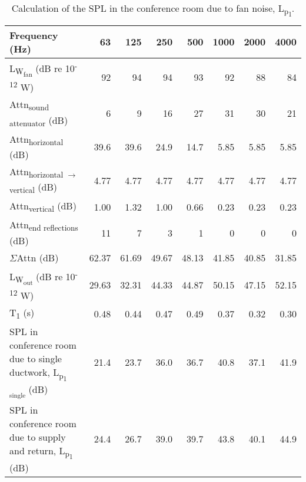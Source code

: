 \begin{table}[htbp]
	\caption{Calculation of the SPL in the conference room due to fan noise, L\textsubscript{p\textsubscript{1}}.}
	\label{tbl:BN_conf}
	\centering
	\begin{tabular}{@{}m{8cm}rrrrrrr@{}}
		\toprule
		Frequency (Hz) & 63 & 125 & 250 & 500 & 1000 & 2000 & 4000 \\ \midrule
		L\textsubscript{W\textsubscript{fan}} (dB re 10\textsuperscript{-12} W) & 92 & 94 & 94 & 93 & 92 & 88 & 84 \\
		Attn\textsubscript{sound attenuator} (dB) & 6 & 9 & 16 & 27 & 31 & 30 & 21 \\
		Attn\textsubscript{horizontal} (dB) & 39.6 & 39.6 & 24.9 & 14.7 & 5.85 & 5.85 & 5.85 \\
		Attn\textsubscript{horizontal $\rightarrow$ vertical} (dB) & 4.77 & 4.77 & 4.77 & 4.77 & 4.77 & 4.77 & 4.77 \\
		Attn\textsubscript{vertical} (dB) & 1.00 & 1.32 & 1.00 & 0.66 & 0.23 & 0.23 & 0.23 \\
		Attn\textsubscript{end reflections} (dB) & 11 & 7 & 3 & 1 & 0 & 0 & 0 \\
		$\Sigma$Attn (dB) & 62.37 & 61.69 & 49.67 & 48.13 & 41.85 & 40.85 & 31.85 \\
		L\textsubscript{W\textsubscript{out}} (dB re 10\textsuperscript{-12} W) & 29.63 & 32.31 & 44.33 & 44.87 & 50.15 & 47.15 & 52.15 \\
		T\textsubscript{1} (s) & 0.48 & 0.44 & 0.47 & 0.49 & 0.37 & 0.32 & 0.30 \\
		SPL in conference room due to single ductwork, L\textsubscript{p\textsubscript{1 single}} (dB) & 21.4 & 23.7 & 36.0 & 36.7 & 40.8 & 37.1 & 41.9 \\
		SPL in conference room due to supply and return, L\textsubscript{p\textsubscript{1}} (dB) & 24.4 & 26.7 & 39.0 & 39.7 & 43.8 & 40.1 & 44.9 \\ \bottomrule
	\end{tabular}
\end{table}